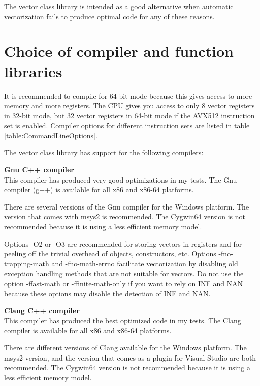 \documentclass[vcl_manual.tex]{subfiles}
\begin{document}
The vector class library is intended as a good alternative when automatic vectorization fails to produce optimal code for any of these reasons.


\section{Choice of compiler and function libraries}\label{ChoiceOfCompiler}

It is recommended to compile for 64-bit mode because this gives access to more memory and more registers. The CPU gives you access to only 8 vector registers in 32-bit mode, but 32 vector registers in 64-bit mode if the AVX512 instruction set is enabled. Compiler options for different instruction sets are listed in table \ref{table:CommandLineOptions}.

The vector class library has support for the following compilers:


\textbf{Gnu C++ compiler}\\
This compiler has produced very good optimizations in my tests. The Gnu compiler (g++) is available for all x86 and x86-64 platforms. 

There are several versions of the Gnu compiler for the Windows platform. The version that comes with msys2 is recommended. The Cygwin64 version is not recommended because it is using a less efficient memory model.

Options -O2 or -O3 are recommended for storing vectors in registers and for peeling off the trivial overhead of objects, constructors, etc. 
Options -fno-trapping-math and -fno-math-errno facilitate vectorization by disabling old exception handling methods that are not suitable for vectors. 
Do not use the option -ffast-math or -ffinite-math-only if you want to rely on INF and NAN because these options may disable the detection of INF and NAN.


\textbf{Clang C++ compiler}\\
This compiler has produced the best optimized code in my tests. The Clang compiler is available for all x86 and x86-64 platforms. 

There are different versions of Clang available for the Windows platform. 
The msys2 version, and the version that comes as a plugin for Visual Studio are both recommended.
The Cygwin64 version is not recommended because it is using a less efficient memory model.
\end{document}
